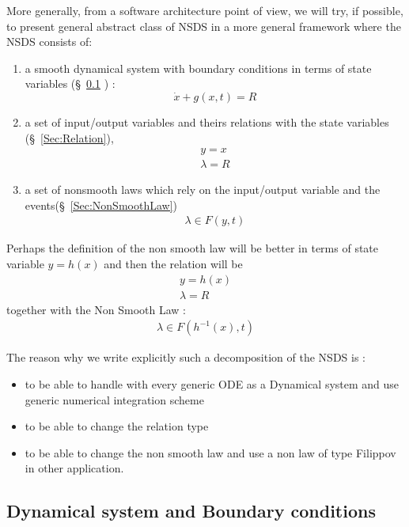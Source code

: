 \documentclass[10pt]{article}
\begin{document}
More generally, from a software architecture point of view, we will try, if possible, to present general abstract class of NSDS in a more general framework where the NSDS consists of:
\begin{enumerate}
\item a smooth dynamical system with boundary conditions in terms of state variables (\S~\ref{Sec:DynamicalSystem} ) :
  \begin{equation}
    \dot x +g(x,t) = R
  \end{equation}
\item a set of input/output variables and theirs relations with the state variables (\S~\ref{Sec:Relation}),
  \begin{eqnarray}
    y=x\\
    \lambda =R
  \end{eqnarray}
\item a set of  nonsmooth laws which rely on the input/output variable and the events(\S~\ref{Sec:NonSmoothLaw})
  \begin{eqnarray}
    \lambda \in F(y,t)
  \end{eqnarray}
\end{enumerate}


 \begin{ndrva}
 Perhaps the definition of the non smooth law will be better in terms of state variable $y=h(x)$ and then the relation will be    
\begin{eqnarray}
    y=h(x)\\
    \lambda =R
  \end{eqnarray}
together with the Non Smooth Law :
  \begin{eqnarray}
    \lambda \in F(h^{-1}(x),t)
  \end{eqnarray}
 \end{ndrva}

The reason why we  write explicitly such a  decomposition of the NSDS is :
\begin{itemize}
\item to be able to handle with every generic ODE as a Dynamical system and use generic numerical integration scheme
\item to be able to change the relation type 
\item to be able to change the non smooth law and use a non law of type Filippov in other application.
\end{itemize}


\subsection{Dynamical system and Boundary conditions}
\label{Sec:DynamicalSystem}
\end{document}
